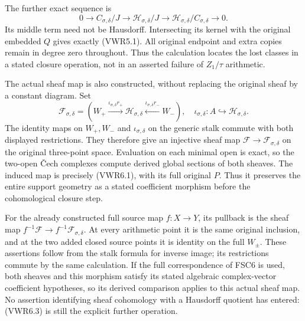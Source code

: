 The further exact sequence is \[
0\longrightarrow C_{\sigma,\delta}/J
\longrightarrow\mathcal H_{\sigma,\delta}/J
\longrightarrow\mathcal H_{\sigma,\delta}/C_{\sigma,\delta}
\longrightarrow0.
\tag{VWR6.3}
\] Its middle term need not be Hausdorff. Intersecting its kernel with
the original embedded \(Q\) gives exactly (VWR5.1). All original
endpoint and extra copies remain in degree zero throughout. Thus the
calculation locates the lost classes in a stated closure operation, not
in an asserted failure of \(Z_1/\tau\) arithmetic.

The actual sheaf map is also constructed, without replacing the original
sheaf by a constant diagram. Set \[
\mathcal F_{\sigma,\delta}
=(W_+\xrightarrow{\iota_{\sigma,\delta}r_+}\mathcal H_{\sigma,\delta}
 \xleftarrow{\iota_{\sigma,\delta}r_-}W_-),
\quad \iota_{\sigma,\delta}:A\hookrightarrow\mathcal H_{\sigma,\delta}.
\tag{VWR6.4}
\] The identity maps on \(W_+,W_-\) and \(\iota_{\sigma,\delta}\) on the
generic stalk commute with both displayed restrictions. They therefore
give an injective sheaf map \(\mathcal F\to\mathcal F_{\sigma,\delta}\)
on the original three-point space. Evaluation on each minimal open is
exact, so the two-open Čech complexes compute derived global sections of
both sheaves. The induced map is precisely (VWR6.1), with its full
original \(P\). Thus it preserves the entire support geometry as a
stated coefficient morphism before the cohomological closure step.

For the already constructed full source map \(f:X\to Y\), its pullback
is the sheaf map
\(f^{-1}\mathcal F\to f^{-1}\mathcal F_{\sigma,\delta}\). At every
arithmetic point it is the same original inclusion, and at the two added
closed source points it is identity on the full \(W_\pm\). These
assertions follow from the stalk formula for inverse image; its
restrictions commute by the same calculation. If the full correspondence
of FSC6 is used, both sheaves and this morphism satisfy its stated
algebraic complex-vector coefficient hypotheses, so its derived
comparison applies to this actual sheaf map. No assertion identifying
sheaf cohomology with a Hausdorff quotient has entered: (VWR6.3) is
still the explicit further operation.

